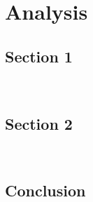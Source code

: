 

\chapter{Analysis}
\label{chap:analysis}

\lipsum[4]

\minitoc
\newpage

\section{Section 1}

\lipsum[5] \\ \lipsum[6]

\section{Section 2}

\lipsum[7] \\ \lipsum[8]


\section{Conclusion}

\lipsum[9]